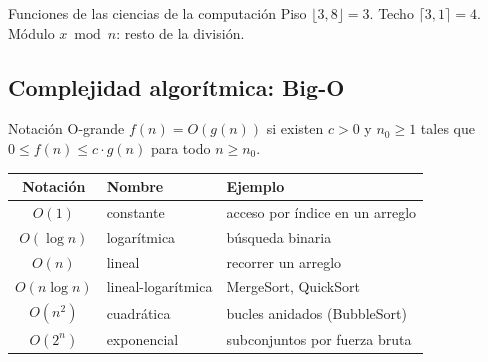 \begin{tmdef}{Funciones de las ciencias de la computaci\'on}
Piso $\lfloor3{,}8\rfloor=3$. Techo $\lceil3{,}1\rceil=4$. M\'odulo $x\bmod n$: resto de la divisi\'on.
\end{tmdef}

\subsection{Complejidad algor\'itmica: Big-O}
\begin{tmdef}{Notaci\'on O-grande}
$f(n)=O(g(n))$ si existen $c>0$ y $n_0\ge1$ tales que $0\le f(n)\le c\cdot g(n)$ para todo $n\ge n_0$.
\end{tmdef}

\begin{center}
\end{center}

\begin{center}
\begin{tabular}{|c|l|l|}
\hline
\rowcolor{tmAzulClaro}\textbf{Notaci\'on} & \textbf{Nombre} & \textbf{Ejemplo}\\ \hline
$O(1)$ & constante & acceso por \'indice en un arreglo\\ \hline
$O(\log n)$ & logar\'itmica & b\'usqueda binaria\\ \hline
$O(n)$ & lineal & recorrer un arreglo\\ \hline
$O(n\log n)$ & lineal-logar\'itmica & MergeSort, QuickSort\\ \hline
$O(n^2)$ & cuadr\'atica & bucles anidados (BubbleSort)\\ \hline
$O(2^n)$ & exponencial & subconjuntos por fuerza bruta\\ \hline
\end{tabular}
\end{center}

